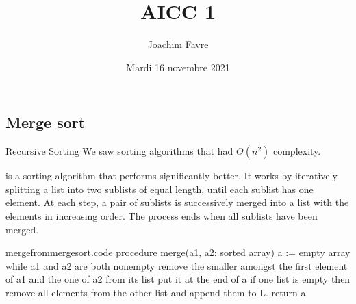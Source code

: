 \documentclass[a4paper]{article}
\title{AICC 1}
\author{Joachim Favre}
\date{Mardi 16 novembre 2021}
\begin{document}
\maketitle


\subsection{Merge sort}
\begin{parag}{Recursive Sorting}
    We saw sorting algorithms that had $\Theta\left(n^2\right)$ complexity.

     is a sorting algorithm that performs significantly better. It works by iteratively splitting a list into two sublists of equal length, until each sublist has one element. At each step, a pair of sublists is successively merged into a list with the elements in increasing order. The process ends when all sublists have been merged.


\end{parag}

\begin{filecontents*}[overwrite]{mergefrommergesort.code}
procedure merge(a1, a2: sorted array) 
    a := empty array
    while a1 and a2 are both nonempty
        remove the smaller amongst the first element of a1 and the one of a2 from its list
        put it at the end of a
    if one list is empty then remove all elements from the other list and append them to L.
    return a
\end{filecontents*}
\end{document}
